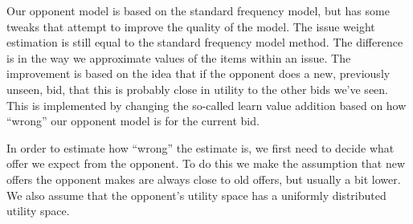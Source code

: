 Our opponent model is based on the standard frequency model, but has some tweaks that attempt to improve the quality of the model. The issue weight estimation is still equal to the standard frequency model method. The difference is in the way we approximate values of the items within an issue. The improvement is based on the idea that if the opponent does a new, previously unseen, bid, that this is probably close in utility to the other bids we've seen. This is implemented by changing the so-called learn value addition based on how ``wrong'' our opponent model is for the current bid. 

In order to estimate how ``wrong'' the estimate is, we first need to decide what offer we expect from the opponent. To do this we make the assumption that new offers the opponent makes are always close to old offers, but usually a bit lower. We also assume that the opponent's utility space has a uniformly distributed utility space. 